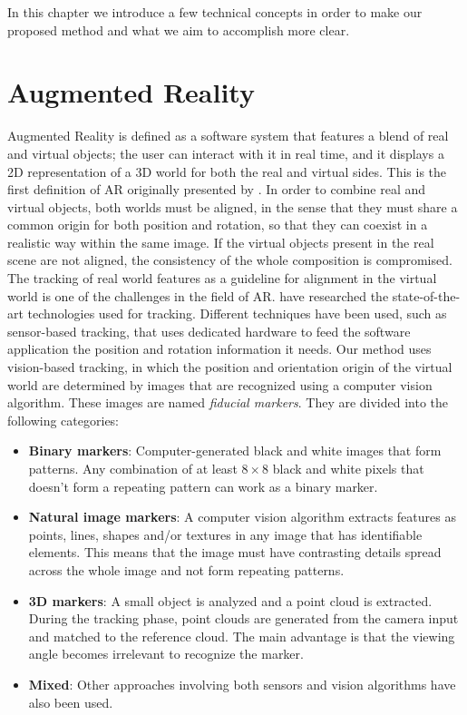
In this chapter we introduce a few technical concepts in order to make our proposed method and what we aim to accomplish more clear.

\section{Augmented Reality}
Augmented Reality is defined as a software system that features a blend of real and virtual objects; the user can interact with it in real time, and it displays a 2D representation of a 3D world for both the real and virtual sides. This is the first definition of AR originally presented by \citep{azuma1997}. \newline
In order to combine real and virtual objects, both worlds must be aligned, in the sense that they must share a common origin for both position and rotation, so that they can coexist in a realistic way within the same image. If the virtual objects present in the real scene are not aligned, the consistency of the whole composition is compromised. \newline
The tracking of real world features as a guideline for alignment in the virtual world is one of the challenges in the field of AR. \citep{zhou2008} have researched the state-of-the-art technologies used for tracking. Different techniques have been used, such as sensor-based tracking, that uses dedicated hardware to feed the software application the position and rotation information it needs. Our method uses vision-based tracking, in which the position and orientation origin of the virtual world are determined by images that are recognized using a computer vision algorithm. These images are named \emph{fiducial markers}. They are divided into the following categories:
\begin{itemize}
  \item \textbf{Binary markers}: Computer-generated black and white images that form patterns. Any combination of at least $8\times8$ black and white pixels that doesn't form a repeating pattern can work as a binary marker.
  \item \textbf{Natural image markers}: A computer vision algorithm extracts features as points, lines, shapes and/or textures in any image that has identifiable elements. This means that the image must have contrasting details spread across the whole image and not form repeating patterns.
  \item \textbf{3D markers}: A small object is analyzed and a point cloud is extracted. During the tracking phase, point clouds are generated from the camera input and matched to the reference cloud. The main advantage is that the viewing angle becomes irrelevant to recognize the marker.
  \item \textbf{Mixed}: Other approaches involving both sensors and vision algorithms have also been used. 
\end{itemize}

